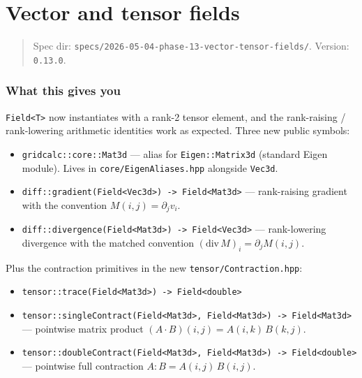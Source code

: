 \chapter{Vector and tensor fields}
\label{chap:vector-tensor-fields}

\begin{quote}
Spec dir:
\passthrough{\lstinline!specs/2026-05-04-phase-13-vector-tensor-fields/!}.
Version: \passthrough{\lstinline!0.13.0!}.
\end{quote}

\subsection{What this gives you}\label{phase13-what}

\passthrough{\lstinline!Field<T>!} now instantiates with a rank-2
tensor element, and the rank-raising / rank-lowering arithmetic
identities work as expected. Three new public symbols:

\begin{itemize}
\tightlist
\item
  \passthrough{\lstinline!gridcalc::core::Mat3d!} — alias for
  \passthrough{\lstinline!Eigen::Matrix3d!} (standard Eigen module).
  Lives in
  \passthrough{\lstinline!core/EigenAliases.hpp!} alongside
  \passthrough{\lstinline!Vec3d!}.
\item
  \passthrough{\lstinline!diff::gradient(Field<Vec3d>) -> Field<Mat3d>!} —
  rank-raising gradient with the convention
  \(M(i, j) = \partial_j v_i\).
\item
  \passthrough{\lstinline!diff::divergence(Field<Mat3d>) -> Field<Vec3d>!} —
  rank-lowering divergence with the matched convention
  \((\mathrm{div}\,M)_i = \partial_j M(i, j)\).
\end{itemize}

Plus the contraction primitives in the new
\passthrough{\lstinline!tensor/Contraction.hpp!}:

\begin{itemize}
\tightlist
\item
  \passthrough{\lstinline!tensor::trace(Field<Mat3d>) -> Field<double>!}
\item
  \passthrough{\lstinline!tensor::singleContract(Field<Mat3d>, Field<Mat3d>) -> Field<Mat3d>!}
  — pointwise matrix product \((A \cdot B)(i,j) = A(i,k)\,B(k,j)\).
\item
  \passthrough{\lstinline!tensor::doubleContract(Field<Mat3d>, Field<Mat3d>) -> Field<double>!}
  — pointwise full contraction \(A : B = A(i,j)\,B(i,j)\).
\end{itemize}

